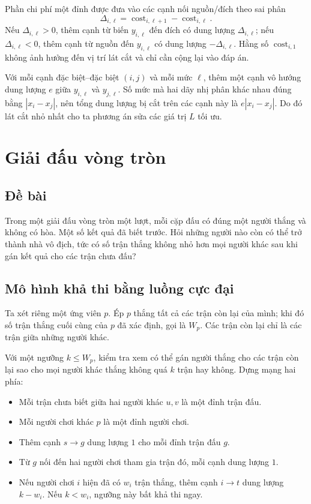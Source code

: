 \documentclass[11pt]{article}
\begin{document}
Phần chi phí một đỉnh được đưa vào các cạnh nối nguồn/đích theo sai phân
\[
  \Delta_{i,\ell}=
  \operatorname{cost}_{i,\ell+1}-\operatorname{cost}_{i,\ell}.
\]
Nếu \(\Delta_{i,\ell}>0\), thêm cạnh từ biến \(y_{i,\ell}\) đến đích có dung
lượng \(\Delta_{i,\ell}\); nếu \(\Delta_{i,\ell}<0\), thêm cạnh từ nguồn đến
\(y_{i,\ell}\) có dung lượng \(-\Delta_{i,\ell}\). Hằng số
\(\operatorname{cost}_{i,1}\) không ảnh hưởng đến vị trí lát cắt và chỉ cần
cộng lại vào đáp án.

Với mỗi cạnh đặc biệt--đặc biệt $(i,j)$ và mỗi mức \(\ell\), thêm một cạnh vô
hướng dung lượng \(e\) giữa \(y_{i,\ell}\) và \(y_{j,\ell}\). Số mức mà hai
dãy nhị phân khác nhau đúng bằng \(|x_i-x_j|\), nên tổng dung lượng bị cắt
trên các cạnh này là \(e|x_i-x_j|\). Do đó lát cắt nhỏ nhất cho ta phương án
sửa các giá trị \(L\) tối ưu.

\section{Giải đấu vòng tròn}

\subsection*{Đề bài}

Trong một giải đấu vòng tròn một lượt, mỗi cặp đấu có đúng một người thắng và
không có hòa. Một số kết quả đã biết trước. Hỏi những người nào còn có thể
trở thành nhà vô địch, tức có số trận thắng không nhỏ hơn mọi người khác sau
khi gán kết quả cho các trận chưa đấu?

\subsection*{Mô hình khả thi bằng luồng cực đại}

Ta xét riêng một ứng viên $p$. Ép $p$ thắng tất cả các trận còn lại của mình;
khi đó số trận thắng cuối cùng của $p$ đã xác định, gọi là \(W_p\). Các trận
còn lại chỉ là các trận giữa những người khác.

Với một ngưỡng \(k\le W_p\), kiểm tra xem có thể gán người thắng cho các trận
còn lại sao cho mọi người khác thắng không quá \(k\) trận hay không. Dựng mạng
hai phía:

\begin{itemize}
  \item Mỗi trận chưa biết giữa hai người khác $u,v$ là một đỉnh trận đấu.
  \item Mỗi người chơi khác $p$ là một đỉnh người chơi.
  \item Thêm cạnh $s\to g$ dung lượng $1$ cho mỗi đỉnh trận đấu $g$.
  \item Từ $g$ nối đến hai người chơi tham gia trận đó, mỗi cạnh dung lượng
  $1$.
  \item Nếu người chơi $i$ hiện đã có $w_i$ trận thắng, thêm cạnh
  $i\to t$ dung lượng \(k-w_i\). Nếu \(k<w_i\), ngưỡng này bất khả thi ngay.
\end{itemize}
\end{document}
